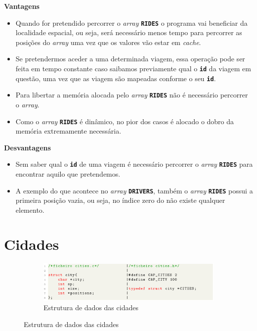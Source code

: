 \documentclass[12pt,a4paper]{report}
\begin{document}
\normalsize\textbf{Vantagens}
\begin{itemize}
   
    \item Quando for pretendido percorrer o \textit{array} \textbf{\small\texttt{RIDES}} o programa vai beneficiar da localidade espacial, ou 
    seja, será necessário menos tempo para percorrer as posições do \textit{array} uma vez que os valores vão estar em \textit{cache}.
    
    \item Se pretendermos aceder a uma determinada viagem, essa operação pode ser feita em tempo constante caso saibamos previamente qual o \textbf{\small\texttt{id}} da viagem em questão, uma vez que as viagem são mapeadas conforme o seu \textbf{\small\texttt{id}}.

    \item Para libertar a memória alocada pelo \textit{array} \textbf{\small\texttt{RIDES}} não é necessário percorrer o \textit{array}.

    \item Como o \textit{array} \textbf{\small\texttt{RIDES}} é dinâmico, no pior dos casos é alocado o dobro da memória extremamente necessária.
\end{itemize}

\pagebreak
\normalsize\textbf{Desvantagens}
\begin{itemize}
    \item Sem saber qual o \textbf{\small\texttt{id}} de uma viagem é necessário percorrer o \textit{array} \textbf{\small\texttt{RIDES}} para encontrar aquilo que pretendemos.
    
    \item A exemplo do que acontece no \textit{array} \textbf{\small\texttt{DRIVERS}}, também o \textit{array} \textbf{\small\texttt{RIDES}} possui a primeira posição vazia, ou seja, no índice zero do não existe qualquer elemento.
\end{itemize}


\section{Cidades}

\begin{figure}[hbt!]
    \centering
    \begin{subfigure}{\textwidth}
        \centering
        \includegraphics[width=1\linewidth]{images/cities.png}
        \caption*{Estrutura de dados das cidades}
        \label{fig:cities}
    \end{subfigure}
\end{figure}
\end{document}
